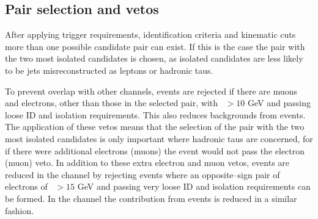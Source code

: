 \subsection{Pair selection and vetos}
\label{sec:mssm_eventsel_pairs}
After applying trigger
requirements, identification criteria and kinematic cuts
more than one possible candidate pair can exist. If
this is the case the pair with the two most isolated candidates
 is chosen, as isolated candidates are less likely 
to be jets misreconstructed
as leptons or hadronic taus.

To prevent overlap with other channels, events are rejected
if there are muons and electrons, other than those in the selected pair,
with \pT~$>10$ GeV and passing loose ID and isolation requirements.
This also reduces backgrounds from \WZ events. The application
of these vetos means that the selection of the pair with the
two most isolated candidates is only important where hadronic
taus are concerned, for if there were additional electrons (muons)
the event would not pass the electron (muon) veto.
In addition to these extra electron and muon vetos, \Zee events are 
reduced in the \etau channel by rejecting events
where an opposite--sign pair of electrons of \pT~$>15$ GeV
and passing very loose ID and isolation requirements can be formed. 
In the \mutau channel the contribution from \Zmm events
is reduced in a similar fashion. 

